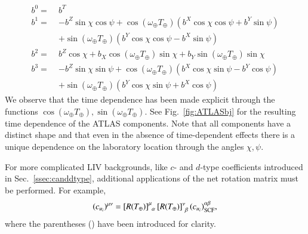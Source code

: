 \begin{align}
\label{ATLAScomps}
b^0 = \; & b^T \\
b^1 = \; & -b^Z\sin\chi\cos\psi + \cos(\omega_\oplus T_\oplus)(b^X\cos\chi\cos\psi + b^Y\sin\psi) \nonumber \\
      & + \sin(\omega_\oplus T_\oplus)(b^Y\cos\chi\cos\psi - b^X\sin \psi) \\
b^2 = \; & b^Z\cos\chi + b_X\cos(\omega_\oplus T_\oplus)\sin\chi + b_Y\sin(\omega_\oplus T_\oplus)\sin\chi  \\
b^3 = \; & -b^Z\sin\chi\sin\psi + \cos(\omega_\oplus T_\oplus)(b^X\cos\chi\sin\psi - b^Y\cos\psi) \nonumber \\
      \; & + \sin(\omega_\oplus T_\oplus)(b^Y\cos\chi\sin\psi + b^X\cos\psi)
%
\end{align}
%
We observe that the time dependence has been made explicit through
the functions $\cos(\omega_\oplus T_\oplus), \sin(\omega_\oplus T_\oplus)$. 
See Fig.~\ref{fig:ATLASbj}
for the resulting time dependence of the ATLAS 
components. Note that all
components have a distinct shape and that even
in the absence of time-dependent effects
there is a unique dependence on the laboratory location
through the angles $\chi, \psi$. 

For more complicated LIV backgrounds, like $c$- and $d$-type coefficients
introduced in Sec.~\ref{ssec:canddtype}, additional applications of the net rotation
matrix must be performed. For example,
%
\begin{equation}
\label{cuexample}
(c_{u_i})^{\mu\nu} = \left[R(T_\oplus)\right]^\mu_{\hphantom{\mu}\alpha}
\left[R(T_\oplus)\right]^\nu_{\hphantom{\nu}\beta}(c_{u_i})_{\text{SCF}}^{\alpha\beta},
\end{equation}
where the parentheses () have been introduced for clarity.
%
%
